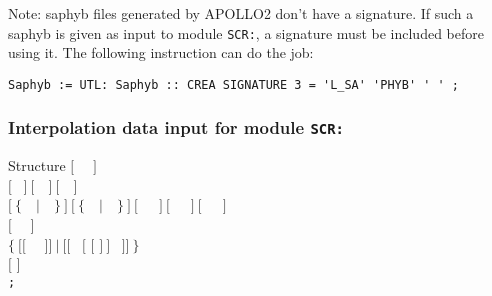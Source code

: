 Note: {\sc saphyb} files generated by APOLLO2 don't have a signature. If such a {\sc saphyb} is given as input
to module {\tt SCR:}, a signature must be included before using it. The following instruction
can do the job:
\begin{verbatim}
Saphyb := UTL: Saphyb :: CREA SIGNATURE 3 = 'L_SA' 'PHYB' ' ' ;
\end{verbatim}

\subsubsection{Interpolation data input for module {\tt SCR:}}\label{sect:descscr}

\vskip -0.5cm

\begin{DataStructure}{Structure }
$[$~ ~$]$ \\
$[$~ $]~[$~~$]~[$~~$]$ \\
$[~\{$~~$|$~~$\}~]~[~\{$~~$|$~~$\}~]~[$~~~$]~[$~~~$]~[$~~~$]$ \\
$[$~ ~$]$ \\
$\{~[[$~  ~$]]~|~[[$~  $[$  $[$  $]~]$ ~$]]~\}$ \\
$[$  $]$ \\
{\tt ;}
\end{DataStructure}

